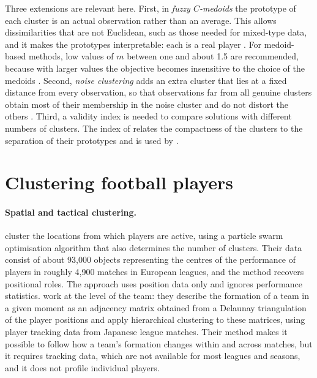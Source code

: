 Three extensions are relevant here. First, in \emph{fuzzy $C$-medoids} the prototype of each cluster is an actual observation rather than an average. This allows dissimilarities that are not Euclidean, such as those needed for mixed-type data, and it makes the prototypes interpretable: each is a real player \cite{krishnapuram2001lowcomplexity}. For medoid-based methods, low values of $m$ between one and about 1.5 are recommended, because with larger values the objective becomes insensitive to the choice of the medoids \cite{durso2022robust}. Second, \emph{noise clustering} adds an extra cluster that lies at a fixed distance from every observation, so that observations far from all genuine clusters obtain most of their membership in the noise cluster and do not distort the others \cite{dave1991noise}. Third, a validity index is needed to compare solutions with different numbers of clusters. The index of  relates the compactness of the clusters to the separation of their prototypes and is used by .

\section{Clustering football players}
\label{sec:lit-football}

\paragraph{Spatial and tactical clustering.}  cluster the locations from which players are active, using a particle swarm optimisation algorithm that also determines the number of clusters. Their data consist of about 93,000 objects representing the centres of the performance of players in roughly 4,900 matches in European leagues, and the method recovers positional roles. The approach uses position data only and ignores performance statistics.  work at the level of the team: they describe the formation of a team in a given moment as an adjacency matrix obtained from a Delaunay triangulation of the player positions and apply hierarchical clustering to these matrices, using player tracking data from Japanese league matches. Their method makes it possible to follow how a team's formation changes within and across matches, but it requires tracking data, which are not available for most leagues and seasons, and it does not profile individual players.

